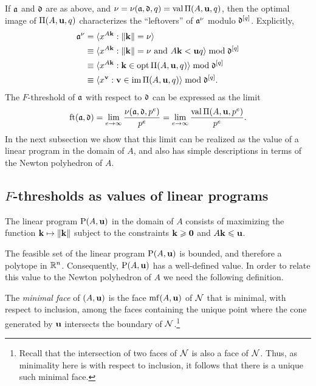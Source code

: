 \documentclass[11pt]{amsart}
\begin{document}
If $\mathfrak{a}$ and $\mathfrak{d}$ are as above, and $\nu = \nu(\mathfrak{a},\mathfrak{d},q) = \operatorname{val} \Pi(A,\mathbf{u},q)$, then the optimal image of $\Pi(A,\mathbf{u},q)$ characterizes the ``leftovers'' of $\mathfrak{a}^\nu$ modulo $\mathfrak{d}^{[q]}$.
Explicitly,
\begin{align*}
  \mathfrak{a}^{\nu} &= \langle x^{A\mathbf{k}}: \| \mathbf{k} \|=\nu \rangle\\
  &\equiv \langle x^{A\mathbf{k}}: \| \mathbf{k} \|=\nu\text{ and } A\mathbf{k} <\mathbf{u}q \rangle \bmod \mathfrak{d}^{[q]}\\
  &\equiv \langle x^{A\mathbf{k}}: \mathbf{k}\in \operatorname{opt}\Pi(A,\mathbf{u},q) \rangle \bmod \mathfrak{d}^{[q]}\\
  &\equiv \langle x^{\mathbf{v}}: \mathbf{v} \in \operatorname{im} \Pi(A,\mathbf{u},q) \rangle \bmod \mathfrak{d}^{[q]}.
\end{align*}
The $F$-threshold of $\mathfrak{a}$ with respect to $\mathfrak{d}$ can be expressed as the limit
\begin{equation}\label{eq: limit}
\operatorname{ft}(\mathfrak{a}, \mathfrak{d}) = \lim_{e\to\infty} \frac{\nu(\mathfrak{a},\mathfrak{d},p^e)}{p^e} = \lim_{e\to\infty} \frac{\operatorname{val} \Pi(A,\mathbf{u},p^e)}{p^e}.
\end{equation}
In the next subsection we show that this limit can be realized as the value of a linear program in the domain of $A$, and also has simple descriptions in terms of the Newton polyhedron of $A$.

\subsection{$F$-thresholds as values of linear programs}

\begin{definition}
   The linear program $\mathrm{P}(A, \mathbf{u})$ in the domain of $A$ consists of maximizing the function $\mathbf{k} \mapsto \| \mathbf{k} \|$ subject to the constraints $\mathbf{k} \geqslant \mathbf{0}$ and $A \mathbf{k} \leqslant \mathbf{u}$.
\end{definition}

The feasible set of the linear program $\mathrm{P}(A,\mathbf{u})$ is bounded, and therefore a polytope in $\mathbb{R}^n$.
Consequently, $\mathrm{P}(A,\mathbf{u})$ has a well-defined value.
In order to relate this value to the Newton polyhedron of $A$ we need the following definition.

\begin{definition}
   The \emph{minimal face} of $(A, \mathbf{u})$ is the face $\operatorname{mf}(A, \mathbf{u})$ of $\mathcal{N}$ that is minimal, with respect to inclusion, among the faces containing the unique point where the cone generated by $\mathbf{u}$ intersects the boundary of $\mathcal{N}$.\footnote{Recall that the intersection of two faces of $\mathcal{N}$ is also a face of $\mathcal{N}$. Thus, as minimality here is with respect to inclusion, it follows that there is a unique such minimal face.}
\end{definition}
\end{document}
